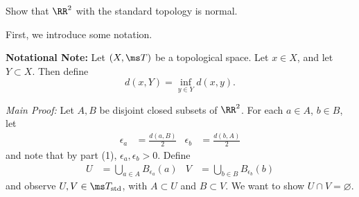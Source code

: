 \documentclass{fkpset}
\newcommand{\tstd}{\ensuremath \ms T_{\rm std}}
\begin{document}
\pagestyle{plain}
\pagestyle{fancy}
  \pointstable{}

  \vspace{1cm}

  \begin{problem}[5.6(4)]
    Show that $\RR^2$ with the standard topology is normal.
  \end{problem}
  \begin{solution}
    First, we introduce some notation.
    \begin{leftbar}
      \textbf{Notational Note:} Let $(X, \ms T)$ be a topological
      space. Let $x \in X$, and let $Y \subset X$. Then define
      \[
        d(x, Y) = \inf_{y \in Y} d(x,y).
      \]
    \end{leftbar}

    \emph{Main Proof:} Let $A,B$ be disjoint closed subsets of
    $\RR^2$. For each $a\in A$, $b\in B$, let
    \begin{align*}
      \epsilon_a &= \frac{d(a,B)}{2} & \epsilon_b &= \frac{d(b,A)}{2}
    \end{align*}
    and note that by part (1), $\epsilon_a, \epsilon_b > 0$. Define
    \begin{align*}
      U &= \bigcup_{a \in A} B_{\epsilon_a}(a) & V &= \bigcup_{b \in B} B_{\epsilon_b}(b)
    \end{align*}
    and observe $U, V \in \tstd$, with $A \subset U$ and $B \subset
    V$. We want to show $U \cap V = \varnothing$.


\end{solution}
\end{document}
